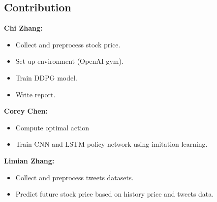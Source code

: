 \documentclass[a4paper, 10pt]{article}
\begin{document}
\begin{spacing}{1.2}
    \section{Contribution}
    \textbf{Chi Zhang:} 
    \begin{itemize}
      \item Collect and preprocess stock price.
      \item Set up environment (OpenAI gym).
      \item Train DDPG model.
      \item Write report.
    \end{itemize}
    \textbf{Corey Chen:}
    \begin{itemize}
      \item Compute optimal action
      \item Train CNN and LSTM policy network using imitation learning.
    \end{itemize}
    \textbf{Limian Zhang:}
    \begin{itemize}
      \item Collect and preprocess tweets datasets.
      \item Predict future stock price based on history price and tweets data.
    \end{itemize}
    
    
%    
    
    
  
  \end{spacing}  

  
  
\end{document}
